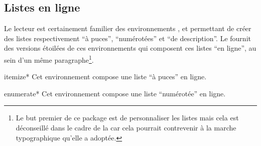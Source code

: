 

\subsection{Listes en ligne}
\label{sec-listes-en-ligne}

Le lecteur est certainement familier des environnements
,  et
 permettant de créer des listes respectivement
\enquote{à puces}, \enquote{numérotées} et \enquote{de description}. Le
 fournit des versions étoilées de ces environnements qui
composent ces listes \enquote{en ligne}, \cad*{} au sein d'un même
paragraphe\footnote{Le but premier de ce package est de personnaliser les listes
  mais cela est déconseillé dans le cadre de la \gzt{} car cela pourrait
  contrevenir à la marche typographique qu'elle a adoptée.}.

\begin{docEnvironment}[doclang/environment content=liste]{itemize*}{}
  Cet environnement compose une liste \enquote{à puces} en ligne.
\end{docEnvironment}

\begin{docEnvironment}[doclang/environment content=liste]{enumerate*}{}
  Cet environnement compose une liste \enquote{numérotée} en ligne.
\end{docEnvironment}

